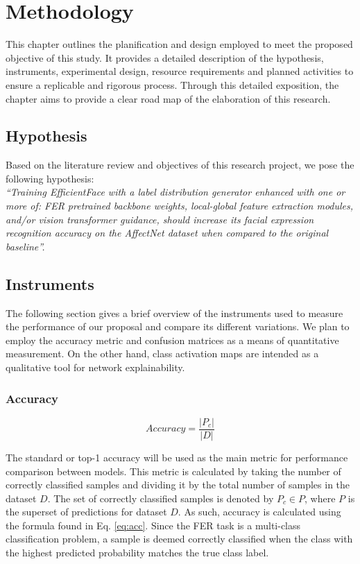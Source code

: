 \documentclass[../main.tex]{subfiles}
\begin{document}
\chapter{Methodology}

This chapter outlines the planification and design employed to meet the proposed objective of this study. 
It provides a detailed description of the hypothesis,  instruments, experimental design, resource requirements and planned activities to ensure a replicable and rigorous process. 
Through this detailed exposition, the chapter aims to provide a clear road map of the elaboration of this research.
\newpage

\section{Hypothesis}

Based on the literature review and objectives of this research project, we pose the following hypothesis:\\

\textit{``Training EfficientFace with a label distribution generator enhanced with one or more of: FER pretrained backbone weights, local-global feature extraction modules, and/or vision transformer guidance, should increase its facial expression recognition accuracy on the AffectNet dataset when compared to the original baseline''.}

\section{Instruments} \label{c5:ins}

The following section gives a brief overview of the instruments used to measure the performance of our proposal and compare its different variations.
We plan to employ the accuracy metric and confusion matrices as a means of quantitative measurement. On the other hand, class activation maps are intended as a qualitative tool for network explainability.

\subsection{Accuracy} \label{c5:ins:acc}

\begin{equation} \label{eq:acc}
    Accuracy = \frac{|P_c|}{|D|}
\end{equation}

The standard or top-1 accuracy will be used as the main metric for performance comparison between models. 
This metric is calculated by taking the number of correctly classified samples and dividing it by the total number of samples in the dataset $D$. 
The set of correctly classified samples is denoted by $P_c \in P$, where $P$ is the superset of predictions for dataset $D$.
As such, accuracy is calculated using the formula found in Eq. \ref{eq:acc}. 
Since the FER task is a multi-class classification problem, a sample is deemed correctly classified when the class with the highest predicted probability matches the true class label.
\end{document}
